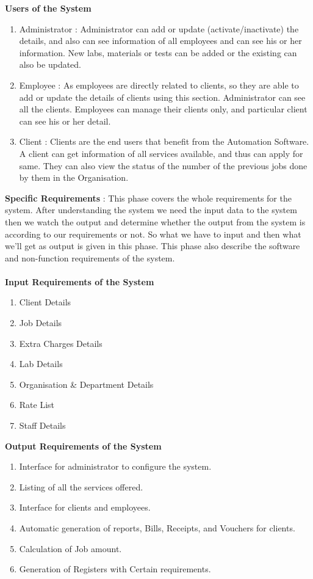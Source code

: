 {\bf Users of the System}
\begin{enumerate} 
\item Administrator : Administrator can add or update (activate/inactivate) the details, and also can see information of all employees and can see his or her information. New labs, materials or tests can be added or the existing can also be updated.
\item Employee : As employees are directly related to clients, so they are able to add or update the details of clients using this section. Administrator can see all the clients. Employees can manage their clients only, and particular client can see his or her detail.
\item Client : Clients are the end users that benefit from the Automation Software. A client can get information of all services available, and thus can apply for same. They can also view the status of the number of the previous jobs done by them in the Organisation.
\end{enumerate}
\vskip 0.5cm
{\bf Specific Requirements} : This phase covers the whole requirements for the system. After understanding the system we need the input data to the system then we watch the output and determine whether the output from the system is according to our requirements or not. So what we have to input and then what we’ll get as output is given in this phase. This phase also describe the software and non-function requirements of the system.\\ \\
{\bf Input Requirements of the System}
\begin{enumerate} 
\item Client Details
\item Job Details
\item Extra Charges Details
\item Lab Details
\item Organisation \& Department Details
\item Rate List
\item Staff Details
\end{enumerate}
\vskip 0.5cm
{\bf Output Requirements of the System}
\begin{enumerate} 
\item Interface for administrator to configure the system.
\item Listing of all the services offered.
\item Interface for clients and employees.
\item Automatic generation of reports, Bills, Receipts, and Vouchers for clients.
\item Calculation of Job amount.
\item Generation of Registers with Certain requirements.
\end{enumerate}
